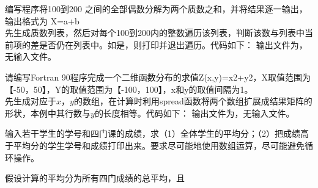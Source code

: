 \documentclass{ctexart}
\begin{document}
\maketitle

\begin{answer}

    编写程序将100到200 之间的全部偶数分解为两个质数之和，并将结果逐一输出，输出格式为 X=a+b\\

    先生成质数列表，然后对每个100到200内的整数遍历该列表，判断该数与列表中当前项的差是否仍在列表中。如是，则打印并退出遍历。代码如下：
    输出文件为，无输入文件。

    请编写Fortran 90程序完成一个二维函数分布的求值Z(x,y)=x2+y2，X取值范围为【-50，50】，Y的取值范围为【-100，100】，x和y的取值间隔为1。\\

    先生成对应于$x$，$y$的数组，在计算时利用spread函数将两个数组扩展成结果矩阵的形状，本例中其行数与$y$的长度相等。代码如下：
    输出文件为，无输入文件。

    输入若干学生的学号和四门课的成绩，求（1）全体学生的平均分；（2）把成绩高于平均分的学生学号和成绩打印出来。要求尽可能地使用数组运算，尽可能避免循环操作。

    假设计算的平均分为所有四门成绩的总平均，且

\end{answer}
\end{document}
